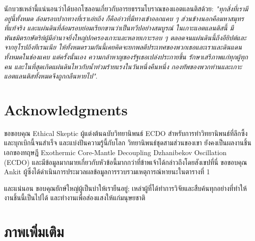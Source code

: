 \documentclass[10pt,twocolumn,letterpaper]{article}
\begin{document}
นักบวชเหล่านี้แน่นอนว่าได้บอกโซลอนเกี่ยวกับอารยธรรมโบราณของแอตแลนติสด้วย: \textit{"ทุกสิ่งที่เรามีอยู่นี้ทั้งหมด ล้อมรอบปากทางที่เราเอ่ยถึง ก็คืออ่าวที่มีทางเข้าออกแคบ ๆ ส่วนข้างนอกคือมหาสมุทรที่แท้จริง และแผ่นดินที่ล้อมรอบย่อมเรียกขานว่าเป็นทวีปอย่างสมบูรณ์ ในเกาะแอตแลนติสนี้ มีพันธมิตรกษัตริย์ผู้มีอำนาจยิ่งใหญ่ปกครองเกาะและหลายเกาะรอบ ๆ ตลอดจนแผ่นดินนี้ถึงอียิปต์และจากยุโรปถึงทีเรนเนีย ให้ทั้งหมดรวมกันนี้เคยคิดจะยกพลตีประเทศของพวกเธอและเราและดินแดนทั้งหมดในช่องแคบ แต่ครั้งนั้นเอง ความกล้าหาญของรัฐเธอเปล่งประกายขึ้น รักษาเสรีภาพแก่ทุกผู้ทุกคน และในที่สุดเกิดแผ่นดินไหวกับน้ำท่วมร้ายแรงในวันหนึ่งคืนหนึ่ง กองทัพของพวกท่านและเกาะแอตแลนติสทั้งหมดจึงถูกกลืนหายไป"}.

\section{Acknowledgments}

ขอขอบคุณ Ethical Skeptic ผู้แต่งต้นฉบับวิทยานิพนธ์ ECDO สำหรับการทำวิทยานิพนธ์ที่ลึกซึ้งและบุกเบิกนี้จนสำเร็จ และแบ่งปันความรู้นี้กับโลก วิทยานิพนธ์ชุดสามส่วนของเขา \cite{1} ยังคงเป็นผลงานชิ้นเอกของทฤษฎี Exothermic Core-Mantle Decoupling Dzhanibekov Oscillation (ECDO) และมีข้อมูลมากมายเกี่ยวกับหัวข้อนี้มากกว่าที่ข้าพเจ้าได้กล่าวถึงโดยสังเขปที่นี่
ขอขอบคุณ Ankit ผู้ซึ่งได้ดำเนินการประมวลผลข้อมูลการรวบรวมเหตุการณ์หายนะในตารางที่ 1

และแน่นอน ขอบคุณยักษ์ใหญ่ผู้เป็นบ่าให้เรายืนอยู่; เหล่าผู้ที่ได้ทำการวิจัยและสืบค้นทุกอย่างที่ทำให้งานชิ้นนี้เป็นไปได้ และทำงานเพื่อส่องแสงให้แก่มนุษยชาติ

\clearpage
\twocolumn

\section{ภาพเพิ่มเติม}
\end{document}

